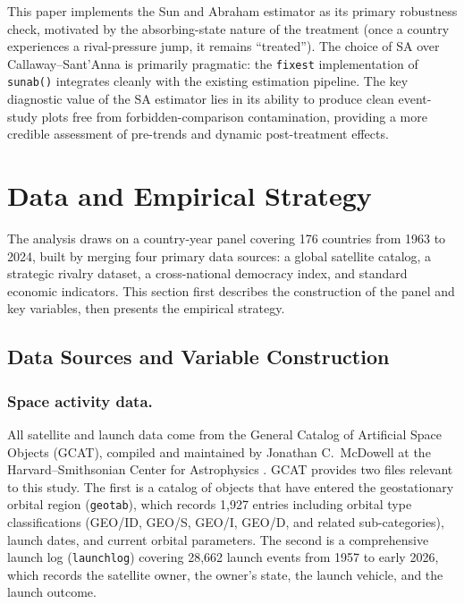 \documentclass[11pt]{article}
\begin{document}
This paper implements the Sun and Abraham \cite{sunab2021} estimator as its primary robustness check, motivated by the absorbing-state nature of the treatment (once a country experiences a rival-pressure jump, it remains ``treated''). The choice of SA over Callaway--Sant'Anna is primarily pragmatic: the \texttt{fixest} implementation of \texttt{sunab()} integrates cleanly with the existing estimation pipeline. The key diagnostic value of the SA estimator lies in its ability to produce clean event-study plots free from forbidden-comparison contamination, providing a more credible assessment of pre-trends and dynamic post-treatment effects.


\section{Data and Empirical Strategy}
The analysis draws on a country-year panel covering 176 countries from 1963 to 2024, built by merging four primary data sources: a global satellite catalog, a strategic rivalry dataset, a cross-national democracy index, and standard economic indicators. This section first describes the construction of the panel and key variables, then presents the empirical strategy.

\subsection{Data Sources and Variable Construction}

\subsubsection{Space activity data.}

All satellite and launch data come from the General Catalog of Artificial Space Objects (GCAT), compiled and maintained by Jonathan C.\ McDowell at the Harvard--Smithsonian Center for Astrophysics \cite{mcdowell2020}. GCAT provides two files relevant to this study. The first is a catalog of objects that have entered the geostationary orbital region (\texttt{geotab}), which records 1,927 entries including orbital type classifications (GEO/ID, GEO/S, GEO/I, GEO/D, and related sub-categories), launch dates, and current orbital parameters. The second is a comprehensive launch log (\texttt{launchlog}) covering 28,662 launch events from 1957 to early 2026, which records the satellite owner, the owner's state, the launch vehicle, and the launch outcome.
\end{document}

